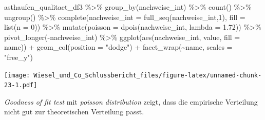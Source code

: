 \documentclass[
  oneside]{scrbook}
\newenvironment{Shaded}{\begin{snugshade}}{\end{snugshade}}
\newcommand{\AttributeTok}[1]{\textcolor[rgb]{0.77,0.63,0.00}{#1}}
\newcommand{\ConstantTok}[1]{\textcolor[rgb]{0.00,0.00,0.00}{#1}}
\newcommand{\DecValTok}[1]{\textcolor[rgb]{0.00,0.00,0.81}{#1}}
\newcommand{\FloatTok}[1]{\textcolor[rgb]{0.00,0.00,0.81}{#1}}
\newcommand{\FunctionTok}[1]{\textcolor[rgb]{0.00,0.00,0.00}{#1}}
\newcommand{\NormalTok}[1]{#1}
\newcommand{\SpecialCharTok}[1]{\textcolor[rgb]{0.00,0.00,0.00}{#1}}
\newcommand{\StringTok}[1]{\textcolor[rgb]{0.31,0.60,0.02}{#1}}
\begin{document}
\begin{Shaded}
\begin{Highlighting}[]
\NormalTok{asthaufen\_qualitaet\_df3 }\SpecialCharTok{\%\textgreater{}\%}
  \FunctionTok{group\_by}\NormalTok{(nachweise\_int) }\SpecialCharTok{\%\textgreater{}\%}
  \FunctionTok{count}\NormalTok{() }\SpecialCharTok{\%\textgreater{}\%} 
  \FunctionTok{ungroup}\NormalTok{() }\SpecialCharTok{\%\textgreater{}\%}
  \FunctionTok{complete}\NormalTok{(}\AttributeTok{nachweise\_int =} \FunctionTok{full\_seq}\NormalTok{(nachweise\_int,}\DecValTok{1}\NormalTok{), }\AttributeTok{fill =} \FunctionTok{list}\NormalTok{(}\AttributeTok{n =} \DecValTok{0}\NormalTok{)) }\SpecialCharTok{\%\textgreater{}\%}
  \FunctionTok{mutate}\NormalTok{(}\AttributeTok{poisson =} \FunctionTok{dpois}\NormalTok{(nachweise\_int, }\AttributeTok{lambda =} \FloatTok{1.72}\NormalTok{)) }\SpecialCharTok{\%\textgreater{}\%}
  \FunctionTok{pivot\_longer}\NormalTok{(}\SpecialCharTok{{-}}\NormalTok{nachweise\_int) }\SpecialCharTok{\%\textgreater{}\%}
  \FunctionTok{ggplot}\NormalTok{(}\FunctionTok{aes}\NormalTok{(nachweise\_int, value, }\AttributeTok{fill =}\NormalTok{ name)) }\SpecialCharTok{+}
  \FunctionTok{geom\_col}\NormalTok{(}\AttributeTok{position =} \StringTok{"dodge"}\NormalTok{) }\SpecialCharTok{+}
  \FunctionTok{facet\_wrap}\NormalTok{(}\SpecialCharTok{\textasciitilde{}}\NormalTok{name, }\AttributeTok{scales =} \StringTok{"free\_y"}\NormalTok{)}
\end{Highlighting}
\end{Shaded}

\texttt{[image: Wiesel\_und\_Co\_Schlussbericht\_files/figure-latex/unnamed-chunk-23-1.pdf]}

\emph{Goodness of fit test} mit \emph{poisson distribution} zeigt, dass die empirische Verteilung nicht gut zur theoretischen Verteilung passt.

\begin{Shaded}
\end{Shaded}
\end{document}
